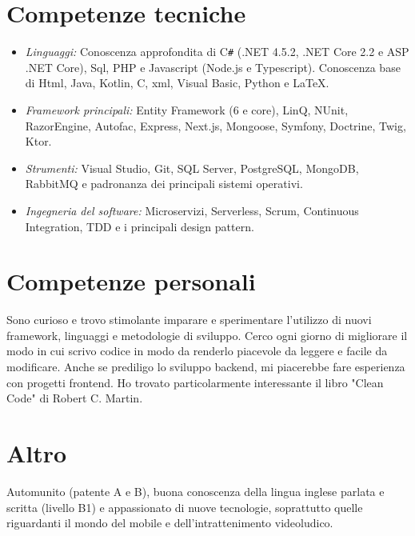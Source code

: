 \documentclass[margin, 10pt]{res} %
\begin{document}
\begin{resume}
\section{Competenze tecniche}

\begin{itemize}

\item {\sl Linguaggi:} Conoscenza approfondita di C\texttt{\#} (.NET 4.5.2, .NET Core 2.2 e ASP .NET Core), Sql, PHP e Javascript (Node.js e Typescript). Conoscenza base di Html, Java, Kotlin, C, xml, Visual Basic, Python e \LaTeX.
\item {\sl Framework principali:} Entity Framework (6 e core), LinQ, NUnit, RazorEngine, Autofac, Express, Next.js, Mongoose, Symfony, Doctrine, Twig, Ktor.
\item {\sl Strumenti:} Visual Studio, Git, SQL Server, PostgreSQL, MongoDB, RabbitMQ e padronanza dei principali sistemi operativi.
\item {\sl Ingegneria del software:} Microservizi, Serverless, Scrum, Continuous Integration, TDD e i principali design pattern.

\end{itemize}

\section{Competenze personali}

Sono curioso e trovo stimolante imparare e sperimentare l'utilizzo di nuovi framework, linguaggi e metodologie di sviluppo. Cerco ogni giorno di migliorare il modo in cui scrivo codice in modo da renderlo piacevole da leggere e facile da modificare. Anche se prediligo lo sviluppo backend, mi piacerebbe fare esperienza con progetti frontend. Ho trovato particolarmente interessante il libro "Clean Code" di Robert C. Martin.

\section{Altro}

Automunito (patente A e B), buona conoscenza della lingua inglese parlata e scritta (livello B1) e appassionato di nuove tecnologie, soprattutto quelle riguardanti il mondo del mobile e dell'intrattenimento videoludico.

\end{resume}
\end{document}
